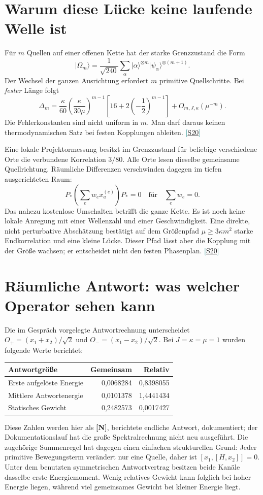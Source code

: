 \documentclass[11pt,a4paper,oneside,parskip=half,headings=normal,numbers=noenddot,bibliography=totoc]{scrreprt}
\newcommand{\ket}[1]{\lvert #1\rangle}
\newcommand{\src}[1]{\textcolor{teal}{\small[\hyperref[s:#1]{S#1}]}}
\newcommand{\st}[1]{\textsf{\textbf{[#1]}}}
\begin{document}
\section{Warum diese Lücke keine laufende Welle ist}
Für $m$ Quellen auf einer offenen Kette hat der starke Grenzzustand die Form
\[
 \ket{\Omega_m}=\frac1{\sqrt{240}}\sum_\alpha
 \ket\alpha^{\otimes m}\ket{\psi_\alpha}^{\otimes(m+1)}.
\]
Der Wechsel der ganzen Ausrichtung erfordert $m$ primitive Quellschritte. Bei \emph{fester} Länge folgt
\[
 \Delta_m=\frac{\kappa}{60}
 \left(\frac{\kappa}{30\mu}\right)^{m-1}
 \left[16+2\left(-\frac12\right)^{m-1}\right]
 +O_{m,J,\kappa}(\mu^{-m}).
\]
Die Fehlerkonstanten sind nicht uniform in $m$. Man darf daraus keinen thermodynamischen Satz bei festen Kopplungen ableiten. \src{20}

Eine lokale Projektormessung besitzt im Grenzzustand für beliebige verschiedene Orte die verbundene Korrelation $3/80$. Alle Orte lesen dieselbe gemeinsame Quellrichtung. Räumliche Differenzen verschwinden dagegen im tiefen ausgerichteten Raum:
\[
 P_*\left(\sum_e w_e x_a^{(e)}\right)P_*=0
 \quad\text{für}\quad\sum_e w_e=0.
\]
Das nahezu kostenlose Umschalten betrifft die ganze Kette. Es ist noch keine lokale Anregung mit einer Wellenzahl und einer Geschwindigkeit. Eine direkte, nicht perturbative Abschätzung bestätigt auf dem Größenpfad $\mu\ge3\kappa m^2$ starke Endkorrelation und eine kleine Lücke. Dieser Pfad lässt aber die Kopplung mit der Größe wachsen; er entscheidet nicht den festen Phasenplan. \src{20}

\section{Räumliche Antwort: was welcher Operator sehen kann}
Die im Gespräch vorgelegte Antwortrechnung unterscheidet $O_+=(x_1+x_2)/\sqrt2$ und $O_-=(x_1-x_2)/\sqrt2$. Bei $J=\kappa=\mu=1$ wurden folgende Werte berichtet:
\begin{center}
\begin{tabular}{@{}lrr@{}}
\toprule
Antwortgröße & Gemeinsam & Relativ\\\midrule
Erste aufgelöste Energie & 0,0068284 & 0,8398055\\
Mittlere Antwortenergie & 0,0101378 & 1,4441434\\
Statisches Gewicht & 0,2482573 & 0,0017427\\\bottomrule
\end{tabular}
\end{center}
Diese Zahlen werden hier als \st{N}, berichtete endliche Antwort, dokumentiert; der Dokumentationslauf hat die große Spektralrechnung nicht neu ausgeführt. Die zugehörige Summenregel hat dagegen einen einfachen strukturellen Grund: Jeder primitive Bewegungsterm verändert nur eine Quelle, daher ist $[x_1,[H,x_2]]=0$. Unter dem benutzten symmetrischen Antwortvertrag besitzen beide Kanäle dasselbe erste Energiemoment. Wenig relatives Gewicht kann folglich bei hoher Energie liegen, während viel gemeinsames Gewicht bei kleiner Energie liegt.
\end{document}
